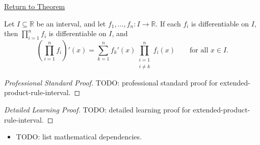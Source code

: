 \newpage
{}
\label{prf:extended-product-rule-interval}

\begin{remark*}[Return]
\hyperref[cor:extended-product-rule-interval]{Return to Theorem}
\end{remark*}

\begin{theorem*}
Let $I \subseteq \mathbb{R}$ be an interval, and let $f_1, \dots, f_n : I \to \mathbb{R}$. If each $f_i$ is differentiable on $I$, then $\prod_{i=1}^{n} f_i$ is differentiable on $I$, and
\[
\left(\prod_{i=1}^{n} f_i\right)'(x)
= \sum_{k=1}^{n} f_k'(x) \prod_{\substack{i=1\\i\neq k}}^{n} f_i(x)
\qquad \text{for all } x \in I.
\]
\end{theorem*}

\begin{proof}[Professional Standard Proof]
\LRAProofBodyStart
TODO: professional standard proof for extended-product-rule-interval.
\end{proof}

\begin{proof}[Detailed Learning Proof]
\LRAProofBodyStart
TODO: detailed learning proof for extended-product-rule-interval.
\end{proof}

\begin{remark*}
\end{remark*}

\begin{dependencies}
\begin{itemize}
  \item TODO: list mathematical dependencies.
\end{itemize}
\end{dependencies}

\clearpage
